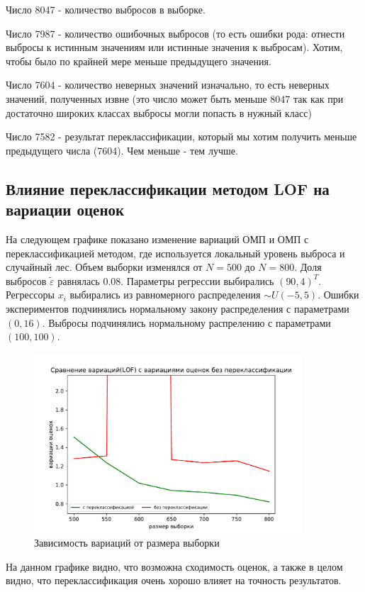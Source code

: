 Число 8047 - количество выбросов в выборке.

Число 7987 - количество ошибочных выбросов (то есть ошибки рода: отнести выбросы к истинным значениям или истинные значения к выбросам). Хотим, чтобы было по крайней мере меньше предыдущего значения.

Число 7604 - количество неверных значений изначально, то есть неверных значений, полученных извне (это число может быть меньше 8047 так как при достаточно широких классах выбросы могли попасть в нужный класс)

Число 7582 - результат переклассификации, который мы хотим получить меньше предыдущего числа (7604). Чем меньше - тем лучше.


\subsection{Влияние переклассификации методом LOF на вариации оценок}
На следующем графике показано изменение вариаций ОМП и ОМП с переклассификацией методом, где используется локальный уровень выброса и случайный лес.
Объем выборки изменялся от $N=500$ до $N=800$. 
Доля выбросов $\widetilde{\varepsilon}$ равнялась $0.08$. 
Параметры регрессии выбирались $(90, 4)^T$. 
Регрессоры $x_i$ выбирались из равномерного распределения $\sim U(-5,5)$. 
Ошибки экспериментов подчинялись нормальному закону распределения с параметрами $(0, 16)$. Выбросы подчинялись нормальному распрелению с параметрами $(100, 100)$. 

\begin{figure}[hb]
    \centering
    \includegraphics[width=100mm]{../images/LOF_without(0).pdf}
    \caption{Зависимость вариаций от размера выборки\label{overflow}}
\end{figure}

На данном графике видно, что возможна сходимость оценок, а также в целом видно, что переклассификация очень хорошо влияет на точность результатов.

\newpage

\newpage
